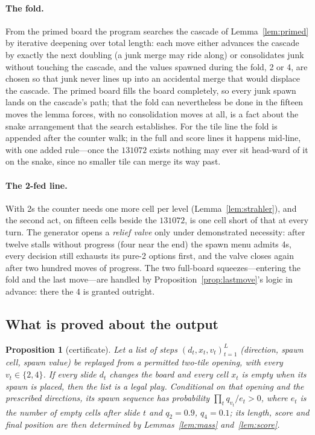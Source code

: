 \documentclass[11pt]{article}
\newtheorem{proposition}[theorem]{Proposition}
\theoremstyle{definition}
\theoremstyle{remark}
\begin{document}
\paragraph{The fold.} From the primed board the program searches the
cascade of Lemma~\ref{lem:primed} by iterative deepening over total length:
each move either advances the cascade by exactly the next doubling (a junk
merge may ride along) or consolidates junk without touching the
cascade, and the values spawned during the fold, 2 or 4, are chosen so
that junk never lines up into an accidental merge that would displace the
cascade. The primed board fills the board completely, so every junk spawn
lands on the cascade's path; that the fold can nevertheless be done in
the fifteen moves the lemma forces, with no consolidation moves at all,
is a fact about the snake arrangement that the search establishes. For
the tile line the fold is appended after the counter walk; in the full and
score lines it happens mid-line, with one added rule---once the $131072$
exists nothing may ever sit head-ward of it on the snake, since no smaller
tile can merge its way past.

\paragraph{The 2-fed line.} With 2s the counter needs one more cell per
level (Lemma~\ref{lem:strahler}), and the second act, on fifteen cells
beside the $131072$, is one cell short of that at every turn. The
generator opens a \emph{relief valve} only under demonstrated necessity:
after twelve stalls without progress (four near the end) the spawn menu
admits 4s, every decision still exhausts its pure-2 options first, and the
valve closes again after two hundred moves of progress. The two
full-board squeezes---entering the fold and the last move---are handled
by Proposition~\ref{prop:lastmove}'s logic in advance: there the 4 is
granted outright.

\subsection{What is proved about the output}

\begin{proposition}[certificate]\label{prop:cert}
Let a list of steps $(d_t,x_t,v_t)_{t=1}^{L}$ (direction, spawn cell,
spawn value) be replayed from a permitted two-tile opening, with every
$v_t\in\{2,4\}$. If every slide $d_t$ changes the board and every cell
$x_t$ is empty when its spawn is placed, then the list is a legal play.
Conditional on that opening and the prescribed directions, its spawn
sequence has probability $\prod_{t}q_{v_t}/e_t>0$, where $e_t$ is the number of empty
cells after slide $t$ and $q_2=0.9$, $q_4=0.1$; its length, score and
final position are then determined by Lemmas~\ref{lem:mass}
and~\ref{lem:score}.
\end{proposition}
\end{document}
